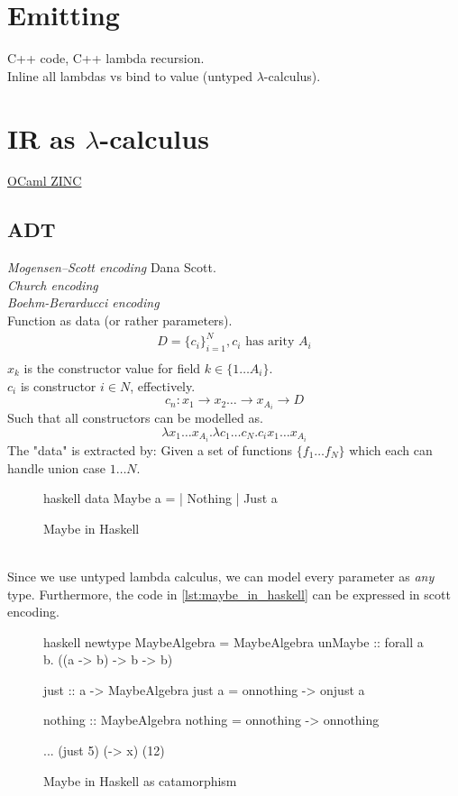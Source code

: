 \documentclass[11pt]{article}
\begin{document}
    \section{Emitting}
    C++ code, C++ lambda recursion.\\
    Inline all lambdas vs bind to value (untyped $\lambda$-calculus).
    \section{IR as $\lambda$-calculus}
    \href{http://caml.inria.fr/pub/papers/xleroy-zinc.pdf}{OCaml ZINC}
    \subsection{ADT}
    \textit{Mogensen–Scott encoding} Dana Scott.\\
    \textit{Church encoding}\\
    \textit{Boehm-Berarducci encoding}\\
    Function as data (or rather parameters).
    \begin{align}
        D = \{ c_i \}^N_{i = 1}, c_i \text{ has arity } A_i\\
    \end{align}
    $x_k$ is the constructor value for field $k \in \{1 \dots A_i\}$.\\
    $c_i$ is constructor $i \in N$, effectively.
    \[
        c_n: x_1 \rightarrow x_2 \dots \rightarrow x_{A_i} \rightarrow D
    \]
    Such that all constructors can be modelled as.
    \[
        \lambda x_1 \dots x_{A_i} . \lambda c_1 \dots c_N . c_i x_1 \dots x_{A_i}
    \]
    The "data" is extracted by: Given a set of functions $\{f_1 \dots f_N\}$ which each can handle union case $1 \dots N$.
    \begin{figure}[htp]
        \centering
        \begin{cminted}{haskell}
data Maybe a =
        | Nothing
        | Just a
        \end{cminted}
        \caption{Maybe in Haskell}
        \label{lst:maybe_in_haskell}
    \end{figure}\\
    Since we use untyped lambda calculus, we can model every parameter as \textit{any} type.
    Furthermore, the code in \autoref{lst:maybe_in_haskell} can be expressed in scott encoding.
    \begin{figure}[htp]
        \centering
        \begin{cminted}{haskell}
newtype MaybeAlgebra =
    MaybeAlgebra{ unMaybe :: forall a b. ((a -> b) -> b -> b) }

just :: a -> MaybeAlgebra
just a = \onjust onnothing -> onjust a

nothing :: MaybeAlgebra
nothing = \onjust onnothing -> onnothing

...
(just 5) (\x -> x) (12)
        \end{cminted}
        \caption{Maybe in Haskell as catamorphism}
        \label{lst:maybe_as_scott}
    \end{figure}
\end{document}
